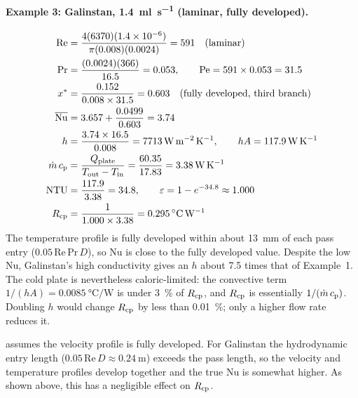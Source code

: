 \paragraph{Example 3: Galinstan, \SI{1.4}{\milli\litre\per\second} (laminar,
fully developed).}
\begin{align*}
  \mathrm{Re} &= \frac{4(6370)(1.4\times10^{-6})}{\pi(0.008)(0.0024)} = 591
    \quad\text{(laminar)}\\
  \mathrm{Pr} &= \frac{(0.0024)(366)}{16.5} = 0.053,
    \qquad \mathrm{Pe} = 591 \times 0.053 = 31.5\\
  x^* &= \frac{0.152}{0.008 \times 31.5} = 0.603
    \quad\text{(fully developed, third branch)}\\
  \overline{\mathrm{Nu}} &= 3.657 + \frac{0.0499}{0.603} = 3.74\\
  h &= \frac{3.74 \times 16.5}{0.008} = \SI{7713}{\watt\per\metre\squared\per\kelvin},
    \qquad hA = \SI{117.9}{\watt\per\kelvin}\\
  \dot{m}\,c_{\mathrm{p}} &= \frac{Q_{\mathrm{plate}}}{T_{\mathrm{out}} - T_{\mathrm{in}}} = \frac{60.35}{17.83}
    = \SI{3.38}{\watt\per\kelvin}\\
  \mathrm{NTU} &= \frac{117.9}{3.38} = 34.8,
    \qquad \varepsilon = 1 - e^{-34.8} \approx 1.000\\
  R_{\mathrm{cp}} &= \frac{1}{1.000 \times 3.38} = \SI{0.295}{\celsius\per\watt}
\end{align*}
The temperature profile is fully developed within about \SI{13}{\milli\metre}
of each pass entry ($0.05\,\mathrm{Re}\,\mathrm{Pr}\,D$), so Nu is close to the
fully developed value. Despite the low Nu, Galinstan's high conductivity gives
an $h$ about 7.5 times that of Example~1. The cold plate is nevertheless
caloric-limited: the convective term $1/(hA) = \SI{0.0085}{\celsius\per\watt}$
is under \SI{3}{\percent} of $R_{\mathrm{cp}}$, and $R_{\mathrm{cp}}$ is essentially $1/(\dot{m}\,c_{\mathrm{p}})$.
Doubling $h$ would change $R_{\mathrm{cp}}$ by less than \SI{0.01}{\percent}; only a higher
flow rate reduces it.

 assumes the velocity profile is fully developed. For
Galinstan the hydrodynamic entry length ($0.05\,\mathrm{Re}\,D \approx
\SI{0.24}{\metre}$) exceeds the pass length, so the velocity and temperature
profiles develop together and the true Nu is somewhat higher. As shown above,
this has a negligible effect on $R_{\mathrm{cp}}$.

